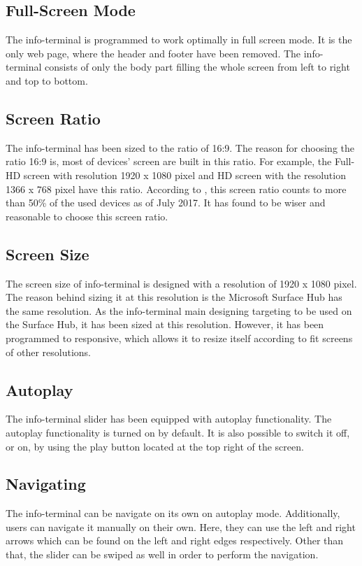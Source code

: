\subsection*{Full-Screen Mode}
The info-terminal is programmed to work optimally in full screen mode. It is the only web page, where the header and footer have been removed. The info-terminal consists of only the body part filling the whole screen from left to right and top to bottom.

\subsection*{Screen Ratio}
The info-terminal has been sized to the ratio of 16:9. The reason for choosing the ratio 16:9 is, most of devices' screen are built in this ratio. For example, the Full-HD screen with resolution 1920 x 1080 pixel and HD screen with the resolution 1366 x 768 pixel have this ratio. According to \cite{screen-stat}, this screen ratio counts to more than 50\% of the used devices as of July 2017. It has found to be wiser and reasonable to choose this screen ratio.

\subsection*{Screen Size}
The screen size of info-terminal is designed with a resolution of 1920 x 1080 pixel. The reason behind sizing it at this resolution is the Microsoft Surface Hub has the same resolution. As the info-terminal main designing targeting to be used on the Surface Hub, it has been sized at this resolution. However, it has been programmed to responsive, which allows it to resize itself according to fit screens of other resolutions.

\subsection*{Autoplay}
The info-terminal slider has been equipped with autoplay functionality. The autoplay functionality is turned on by default. It is also possible to switch it off, or on, by using the play button located at the top right of the screen.

\subsection*{Navigating}
The info-terminal can be navigate on its own on autoplay mode. Additionally, users can navigate it manually on their own. Here, they can use the left and right arrows which can be found on the left and right edges respectively. Other than that, the slider can be swiped as well in order to perform the navigation.

